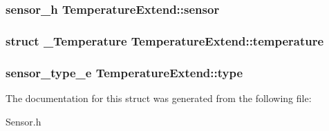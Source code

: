 \subsubsection[{sensor}]{\setlength{\rightskip}{0pt plus 5cm}sensor\-\_\-h Temperature\-Extend\-::sensor}\label{structTemperatureExtend_ac34db86753df4d8667cdaf60133e4321}
\subsubsection[{temperature}]{\setlength{\rightskip}{0pt plus 5cm}struct {\bf \-\_\-\-Temperature} Temperature\-Extend\-::temperature}\label{structTemperatureExtend_a1945df07e1b14c53da9611270750d998}
\subsubsection[{type}]{\setlength{\rightskip}{0pt plus 5cm}sensor\-\_\-type\-\_\-e Temperature\-Extend\-::type}\label{structTemperatureExtend_a93ba9f143fec00e4b5dcfd612b28ad3e}


The documentation for this struct was generated from the following file\-:\begin{DoxyCompactItemize}
\item 
Sensor.\-h\end{DoxyCompactItemize}
